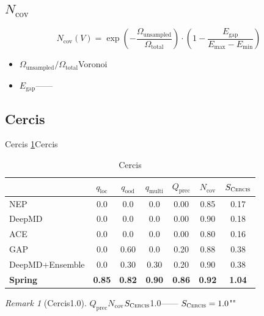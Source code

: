 \documentclass[12pt,a4paper]{article}
\theoremstyle{remark}
\newtheorem{remark}[theorem]{Remark}
\newcommand{\Cercis}{\textsc{Cercis}}
\begin{document}
\subsection{$N_{\text{cov}}$}



\begin{equation}\label{eq:N_coverage}
    N_{\text{cov}}(V) = \exp\left(-\frac{\Omega_{\text{unsampled}}}{\Omega_{\text{total}}}\right) \cdot \left(1 - \frac{E_{\text{gap}}}{E_{\max} - E_{\min}}\right)
\end{equation}


\begin{itemize}[nosep]
    \item $\Omega_{\text{unsampled}}/\Omega_{\text{total}}$Voronoi
    \item $E_{\text{gap}}$——
\end{itemize}

\subsection{Cercis}

Cercis\textbf{}
\ref{tab:cercis_comparison}Cercis

\begin{table}[H]
\centering
\caption{Cercis}
\label{tab:cercis_comparison}
\begin{tabular}{@{}l c c c c c c@{}}
\toprule
\textbf{} & \textbf{$q_{\text{loc}}$} & \textbf{$q_{\text{ood}}$} & \textbf{$q_{\text{multi}}$} & \textbf{$Q_{\text{prec}}$} & \textbf{$N_{\text{cov}}$} & \textbf{$S_{\Cercis}$} \\
\midrule
NEP & 0.0 & 0.0 & 0.0 & 0.00 & 0.85 & 0.17 \\
DeepMD & 0.0 & 0.0 & 0.0 & 0.00 & 0.90 & 0.18 \\
ACE & 0.0 & 0.0 & 0.0 & 0.00 & 0.80 & 0.16 \\
GAP & 0.0 & 0.60 & 0.0 & 0.20 & 0.88 & 0.38 \\
DeepMD+Ensemble & 0.0 & 0.30 & 0.30 & 0.20 & 0.90 & 0.38 \\
\textbf{Spring} & \textbf{0.85} & \textbf{0.82} & \textbf{0.90} & \textbf{0.86} & \textbf{0.92} & \textbf{1.04} \\
\bottomrule
\end{tabular}
\end{table}

\begin{remark}[Cercis1.0]
$Q_{\text{prec}}$$N_{\text{cov}}$$S_{\Cercis}$1.0——
$S_{\Cercis} = 1.0$""
\end{remark}
\end{document}
